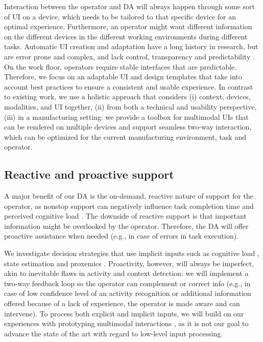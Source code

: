 Interaction between the operator and DA will always happen through some sort of UI on a device, which needs to be tailored to that specific device for an optimal experience. Furthermore, an operator might want different information on the different devices in the different working environments during different tasks. Automatic UI creation and adaptation have a long history in research, but are error prone and complex, and lack control, transparency and predictability \cite{lavie2010BenefitsCostsAdaptive}. On the work floor, operators require stable interfaces that are predictable. Therefore, we focus on an adaptable UI \cite{bunt2007SupportingInterfaceCustomization} and design templates that take into account best practices \cite{ratzka2013UserInterfacePatterns} to ensure a consistent and usable experience. In contrast to existing work, we use a holistic approach that considers (i) context, devices, modalities, and UI together, (ii) from both a technical and usability perspective, (iii) in a manufacturing setting: we provide a toolbox for multimodal UIs that can be rendered on multiple devices and support seamless two-way interaction, which can be optimized for the current manufacturing environment, task and operator.

\subsection{Reactive and proactive support} \label{sec:ReactiveProactive}
A major benefit of our DA is the on-demand, reactive nature of support for the operator, as nonstop support can negatively influence task completion time and perceived cognitive load \cite{funk2017WorkingAugmentedReality}. The downside of reactive support is that important information might be overlooked by the operator. Therefore, the DA will offer proactive assistance when needed (e.g., in case of errors in task execution). 

We investigate decision strategies that use implicit inputs such as cognitive load \cite{lindlbauer2019ContextAwareOnlineAdaptation}, state estimation and proxemics \cite{Marquardt_2015} \cite{Williamson_2022}. Proactivity, however, will always be imperfect, akin to inevitable flaws in activity and context detection: we will implement a two-way feedback loop so the operator can complement or correct info (e.g., in case of low confidence level of an activity recognition or additional information offered because of a lack of experience, the operator is made aware and can intervene). 
To process both explicit and implicit inputs, we will build on our experiences with prototyping multimodal interactions \cite{eshet2016ContextUseFinal}, as it is not our goal to advance the state of the art with regard to low-level input processing. 

